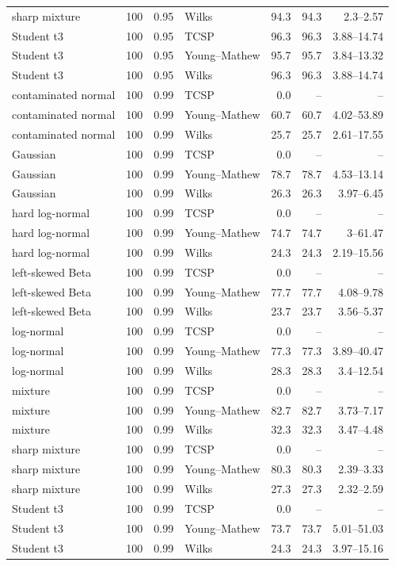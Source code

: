 \begin{longtable}{@{}p{}rrp{}rrr@{}}
sharp mixture & 100 & 0.95 & Wilks & 94.3 & 94.3 & 2.3--2.57 \\
Student t3 & 100 & 0.95 & TCSP & 96.3 & 96.3 & 3.88--14.74 \\
Student t3 & 100 & 0.95 & Young--Mathew & 95.7 & 95.7 & 3.84--13.32 \\
Student t3 & 100 & 0.95 & Wilks & 96.3 & 96.3 & 3.88--14.74 \\
contaminated normal & 100 & 0.99 & TCSP & 0.0 & -- & -- \\
contaminated normal & 100 & 0.99 & Young--Mathew & 60.7 & 60.7 & 4.02--53.89 \\
contaminated normal & 100 & 0.99 & Wilks & 25.7 & 25.7 & 2.61--17.55 \\
Gaussian & 100 & 0.99 & TCSP & 0.0 & -- & -- \\
Gaussian & 100 & 0.99 & Young--Mathew & 78.7 & 78.7 & 4.53--13.14 \\
Gaussian & 100 & 0.99 & Wilks & 26.3 & 26.3 & 3.97--6.45 \\
hard log-normal & 100 & 0.99 & TCSP & 0.0 & -- & -- \\
hard log-normal & 100 & 0.99 & Young--Mathew & 74.7 & 74.7 & 3--61.47 \\
hard log-normal & 100 & 0.99 & Wilks & 24.3 & 24.3 & 2.19--15.56 \\
left-skewed Beta & 100 & 0.99 & TCSP & 0.0 & -- & -- \\
left-skewed Beta & 100 & 0.99 & Young--Mathew & 77.7 & 77.7 & 4.08--9.78 \\
left-skewed Beta & 100 & 0.99 & Wilks & 23.7 & 23.7 & 3.56--5.37 \\
log-normal & 100 & 0.99 & TCSP & 0.0 & -- & -- \\
log-normal & 100 & 0.99 & Young--Mathew & 77.3 & 77.3 & 3.89--40.47 \\
log-normal & 100 & 0.99 & Wilks & 28.3 & 28.3 & 3.4--12.54 \\
mixture & 100 & 0.99 & TCSP & 0.0 & -- & -- \\
mixture & 100 & 0.99 & Young--Mathew & 82.7 & 82.7 & 3.73--7.17 \\
mixture & 100 & 0.99 & Wilks & 32.3 & 32.3 & 3.47--4.48 \\
sharp mixture & 100 & 0.99 & TCSP & 0.0 & -- & -- \\
sharp mixture & 100 & 0.99 & Young--Mathew & 80.3 & 80.3 & 2.39--3.33 \\
sharp mixture & 100 & 0.99 & Wilks & 27.3 & 27.3 & 2.32--2.59 \\
Student t3 & 100 & 0.99 & TCSP & 0.0 & -- & -- \\
Student t3 & 100 & 0.99 & Young--Mathew & 73.7 & 73.7 & 5.01--51.03 \\
Student t3 & 100 & 0.99 & Wilks & 24.3 & 24.3 & 3.97--15.16 \\
\bottomrule
\end{longtable}
\endgroup
